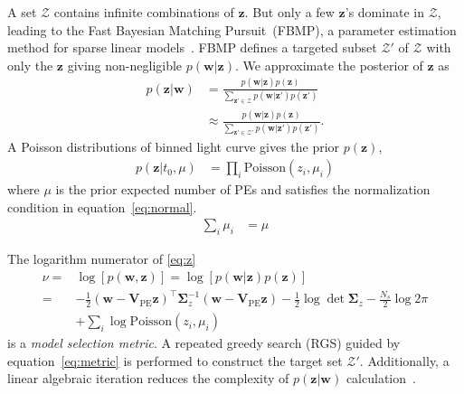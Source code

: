 A set $\mathcal{Z}$ contains infinite combinations of $\bm{z}$. But only a few $\bm{z}$'s dominate in $\mathcal{Z}$, leading to the Fast Bayesian Matching Pursuit~(FBMP), a parameter estimation method for sparse linear models~\cite{schniter_fast_2008}. FBMP defines a targeted subset $\mathcal{Z}'$ of $\mathcal{Z}$ with only the $\bm{z}$ giving non-negligible $p(\bm{w}|\bm{z})$. We approximate the posterior of $\bm{z}$ as 
\begin{equation}
    \label{eq:z}
    \begin{aligned}
    p(\bm{z}|\bm{w}) &= \frac{p(\bm{w}|\bm{z})p(\bm{z})}{\sum_{\bm{z}'\in\mathcal{Z}}p(\bm{w}|\bm{z'})p(\bm{z'})} \\
    &\approx \frac{p(\bm{w}|\bm{z})p(\bm{z})}{\sum_{\bm{z}'\in\mathcal{Z}'}p(\bm{w}|\bm{z'})p(\bm{z'})}.
    \end{aligned}
\end{equation}
A Poisson distributions of binned light curve gives the prior $p(\bm{z})$, 
\begin{equation}
\begin{aligned}
    p(\bm{z}|t_0, \mu) &= \prod_{i}\mathrm{Poisson}(z_i,\mu_i)
\end{aligned}
\end{equation}
where $\mu$ is the prior expected number of PEs and satisfies the normalization condition in equation~\eqref{eq:normal}. 
\begin{equation}
\label{eq:normal}
\begin{aligned}
  \sum_i \mu_i &= \mu
\end{aligned}
\end{equation}

The logarithm numerator of \eqref{eq:z}
\begin{equation}
    \label{eq:metric}
    \begin{aligned}
        \nu =& \log[p(\bm{w},\bm{z})] = \log[p(\bm{w}|\bm{z})p(\bm{z})] \\
        =& -\frac{1}{2}(\bm{w}-\bm{V}_\mathrm{PE}\bm{z})^\intercal\bm{\Sigma}_z^{-1}(\bm{w}-\bm{V}_\mathrm{PE}\bm{z})-\frac{1}{2}\log\det\bm{\Sigma}_z-\frac{N_s}{2}\log2\pi \\
        & +\sum_{i}\log{\mathrm{Poisson}(z_i,\mu_i)}
    \end{aligned}
\end{equation}
is a \textit{model selection metric}. A repeated greedy search (RGS) guided by equation~\eqref{eq:metric} is performed to construct the target set $\mathcal{Z}'$. Additionally, a linear algebraic iteration reduces the complexity of $p(\bm{z}|\bm{w})$ calculation~\cite{schniter_fast_2008}. 

